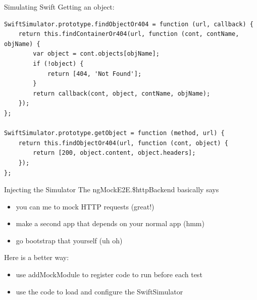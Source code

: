 \documentclass[t,noamsthm]{beamer}
\newcommand{\code}[1]{#1}
\begin{document}
\begin{frame}{Simulating Swift}
\framebreak
Getting an object:
\begin{lstlisting}
SwiftSimulator.prototype.findObjectOr404 = function (url, callback) {
    return this.findContainerOr404(url, function (cont, contName, objName) {
        var object = cont.objects[objName];
        if (!object) {
            return [404, 'Not Found'];
        }
        return callback(cont, object, contName, objName);
    });
};

SwiftSimulator.prototype.getObject = function (method, url) {
    return this.findObjectOr404(url, function (cont, object) {
        return [200, object.content, object.headers];
    });
};
\end{lstlisting}

\end{frame}

\begin{frame}{Injecting the Simulator}
  The \code{ngMockE2E.\$httpBackend} basically says
  \begin{itemize}
  \item you can me to mock HTTP requests (great!)
  \item make a second app that depends on your normal app (hmm)
  \item go bootstrap that yourself (uh oh)
  \end{itemize}

  Here is a better way:
  \begin{itemize}
  \item use addMockModule to register code to run before each test
  \item use the code to load and configure the SwiftSimulator
  \end{itemize}
\end{frame}
\end{document}
